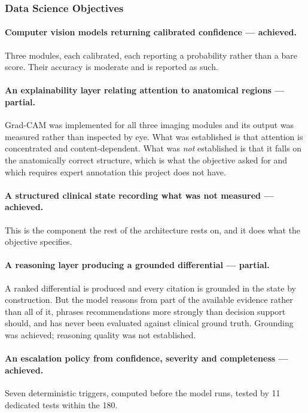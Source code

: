 \subsubsection{Data Science Objectives}

\paragraph{Computer vision models returning calibrated confidence --- achieved.} Three modules,
each calibrated, each reporting a probability rather than a bare score. Their accuracy is
moderate and is reported as such.

\paragraph{An explainability layer relating attention to anatomical regions --- partial.}
Grad-CAM was implemented for all three imaging modules and its output was measured rather than
inspected by eye. What was established is that attention is concentrated and content-dependent.
What was \emph{not} established is that it falls on the anatomically correct structure, which is
what the objective asked for and which requires expert annotation this project does not have.

\paragraph{A structured clinical state recording what was not measured --- achieved.} This is
the component the rest of the architecture rests on, and it does what the objective specifies.

\paragraph{A reasoning layer producing a grounded differential --- partial.} A ranked
differential is produced and every citation is grounded in the state by construction. But the
model reasons from part of the available evidence rather than all of it, phrases recommendations
more strongly than decision support should, and has never been evaluated against clinical ground
truth. Grounding was achieved; reasoning quality was not established.

\paragraph{An escalation policy from confidence, severity and completeness --- achieved.} Seven
deterministic triggers, computed before the model runs, tested by 11 dedicated tests within the
180.


